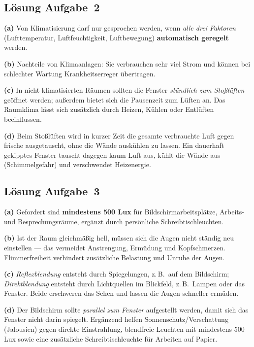 \documentclass[11pt, a4paper]{article}
\begin{document}
\subsection*{Lösung Aufgabe~2}
\begin{loesung}
\textbf{(a)} Von Klimatisierung darf nur gesprochen werden, wenn \emph{alle drei
Faktoren} (Lufttemperatur, Luftfeuchtigkeit, Luftbewegung) \textbf{automatisch geregelt}
werden.

\textbf{(b)} Nachteile von Klimaanlagen: Sie verbrauchen sehr viel Strom und können bei
schlechter Wartung Krankheitserreger übertragen.

\textbf{(c)} In nicht klimatisierten Räumen sollten die Fenster \emph{stündlich zum
Stoßlüften} geöffnet werden; außerdem bietet sich die Pausenzeit zum Lüften an. Das
Raumklima lässt sich zusätzlich durch Heizen, Kühlen oder Entlüften beeinflussen.

\textbf{(d)} Beim Stoßlüften wird in kurzer Zeit die gesamte verbrauchte Luft gegen
frische ausgetauscht, ohne die Wände auskühlen zu lassen. Ein dauerhaft gekipptes Fenster
tauscht dagegen kaum Luft aus, kühlt die Wände aus (Schimmelgefahr) und verschwendet
Heizenergie.
\end{loesung}

\subsection*{Lösung Aufgabe~3}
\begin{loesung}
\textbf{(a)} Gefordert sind \textbf{mindestens 500 Lux} für Bildschirmarbeitsplätze,
Arbeits- und Besprechungsräume, ergänzt durch persönliche Schreibtischleuchten.

\textbf{(b)} Ist der Raum gleichmäßig hell, müssen sich die Augen nicht ständig neu
einstellen --- das vermeidet Anstrengung, Ermüdung und Kopfschmerzen. Flimmerfreiheit
verhindert zusätzliche Belastung und Unruhe der Augen.

\textbf{(c)} \emph{Reflexblendung} entsteht durch Spiegelungen, z.\,B.\ auf dem Bildschirm;
\emph{Direktblendung} entsteht durch Lichtquellen im Blickfeld, z.\,B.\ Lampen oder das
Fenster. Beide erschweren das Sehen und lassen die Augen schneller ermüden.

\textbf{(d)} Der Bildschirm sollte \emph{parallel zum Fenster} aufgestellt werden, damit
sich das Fenster nicht darin spiegelt. Ergänzend helfen Sonnenschutz/Verschattung
(Jalousien) gegen direkte Einstrahlung, blendfreie Leuchten mit mindestens 500 Lux sowie
eine zusätzliche Schreibtischleuchte für Arbeiten auf Papier.
\end{loesung}
\end{document}
